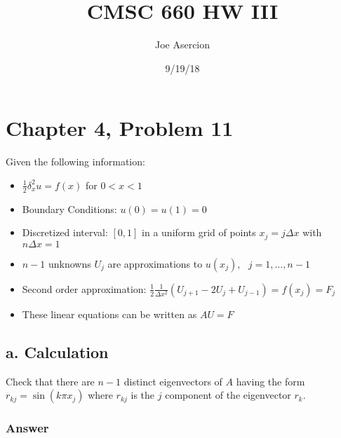 \documentclass{article}
\title{CMSC 660 HW III}
\date{9/19/18}
\author{Joe Asercion}
\begin{document}
	\maketitle
	\section{Chapter 4, Problem 11}
	Given the following information:
	\begin{itemize}
		\item $\frac{1}{2}\delta_{x}^{2}u=f(x)$ for $0<x<1$ 
		\item Boundary Conditions: $u(0)=u(1)=0$
		\item Discretized interval: $[0,1]$ in a uniform grid of points $x_{j}=j\Delta x$ with $n\Delta x=1$
		\item  $n-1$ unknowns $U_{j}$ are approximations to $u(x_{j}),\text{ }j=1,...,n-1$
		\item Second order approximation: $\frac{1}{2}\frac{1}{\Delta x^{2}}(U_{j+1}-2U_{j}+U_{j-1})=f(x_j)=F_j$\\
		\item These linear equations can be written as $AU=F$
	\end{itemize}
	\subsection{a. Calculation}
	Check that there are $n-1$ distinct eigenvectors of $A$ having the form $r_{kj}=\sin(k\pi x_{j})$ where $r_{kj}$ is the $j$ component of the eigenvector $r_{k}$.
	\subsubsection{Answer}
	
\end{document}
